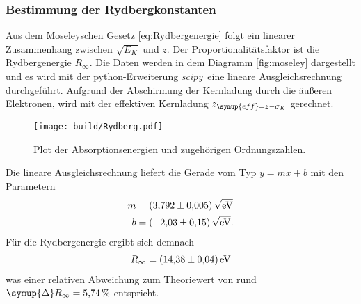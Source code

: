 \subsubsection{Bestimmung der Rydbergkonstanten}
Aus dem Moseleyschen Gesetz \eqref{eq:Rydbergenergie} folgt ein linearer Zusammenhang zwischen $\sqrt{E_{K}}$ und $z$. Der 
Proportionalitätsfaktor ist die Rydbergenergie $R_\infty$. Die Daten werden in dem Diagramm \autoref{fig:moseley} dargestellt und es wird
mit der python-Erweiterung \textit{scipy}\,\cite{scipy} eine lineare Ausgleichsrechnung durchgeführt.
Aufgrund der Abschirmung der Kernladung durch die äußeren Elektronen, wird mit der effektiven Kernladung $z_{\symup{eff}=z-\sigma_{K}}$
gerechnet.

\begin{figure}[H]
  \centering
  \texttt{[image: build/Rydberg.pdf]}
  \caption{Plot der Absorptionsenergien und zugehörigen Ordnungszahlen.}
  \label{fig:moseley}
\end{figure}

Die lineare Ausgleichsrechnung liefert die Gerade vom Typ $y = mx +b$ mit den Parametern
\begin{align*}
  m &= \qty{3,792+-0.005}{\sqrt{\unit{\electronvolt}}} \\
  b &= \qty{-2.03+-0.15}{\sqrt{\unit{\electronvolt}}}.
\end{align*}
Für die Rydbergenergie ergibt sich demnach 
\begin{align*}
  R_{\infty} = \qty{14.38+-0.04}{\electronvolt}
\end{align*}
was einer relativen Abweichung zum Theoriewert von rund $\symup{\Delta}R_{\infty} = \qty{5.74}{\percent}$ entspricht.
